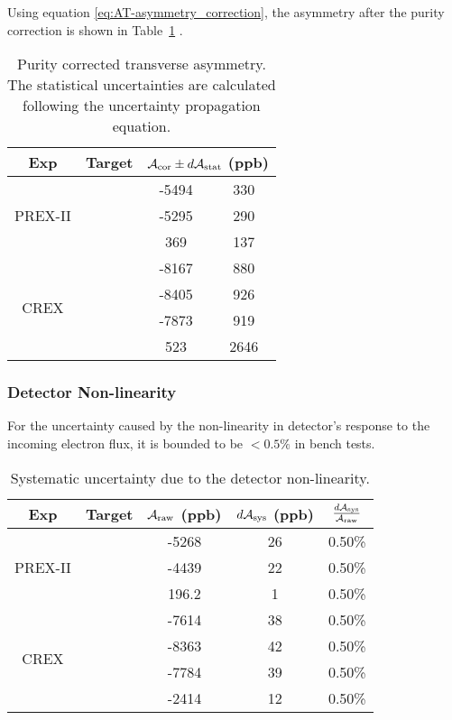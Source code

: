Using equation \ref{eq:AT-asymmetry_correction}, the asymmetry after the purity correction
is shown in Table~\ref{tab:purity_corrected_asymmetry} .
\begin{table}
    \centering
    \begin{tabular}{c c | c c }
	\hline
	Exp & Target	
	& \multicolumn{2}{c}{$\mathcal{A}_{\text{cor}}  \pm d\mathcal{A}_{\text{stat}}$ (ppb)}	    \\
	\hline
	\multirow{3}{*}{PREX-II}
	    & \Carbon    & -5494	& 330	 \\ 
	    & \Ca   & -5295	& 290	 \\ 
	    & \Pb   & 369	& 137	 \\ 
	\hline
	\multirow{4}{*}{CREX}
	    & \Carbon    & -8167	& 880	 \\ 
	    & \ca   & -8405	& 926	 \\ 
	    & \Ca   & -7873	& 919	 \\ 
	    & \Pb   & 523	& 2646	 \\ 
	\hline
    \end{tabular}
    \caption{Purity corrected transverse asymmetry. The statistical uncertainties
    are calculated following the uncertainty propagation equation.}
    \label{tab:purity_corrected_asymmetry}
\end{table}

\subsubsection{Detector Non-linearity}
For the uncertainty caused by the non-linearity in detector's response to the incoming electron flux,
it is bounded to be $<0.5\%$ in bench tests.
\begin{table}[!h]
    \centering
    \begin{tabular}{c c | c c c}
	\hline
	Exp & Target	& $\mathcal{A}_{\text{raw}}$ (ppb) & $d\mathcal{A}_{\text{sys}}$ (ppb)    & $\frac{d\mathcal{A}_{\text{sys}}}{\mathcal{A}_{\text{raw}}}$   \\
	\hline
	\multirow{3}{*}{PREX-II}
	    & \Carbon    & -5268	& 26	& 0.50\%    \\ 
	    & \ca   & -4439	& 22	& 0.50\%    \\ 
	    & \Pb   & 196.2	& 1	& 0.50\%    \\ 
	\hline
	\multirow{4}{*}{CREX}
	    & \Carbon    & -7614	& 38	& 0.50\%    \\ 
	    & \ca   & -8363	& 42	& 0.50\%    \\ 
	    & \Ca   & -7784	& 39	& 0.50\%    \\ 
	    & \Pb   & -2414	& 12	& 0.50\%    \\ 
	\hline
    \end{tabular}
    \caption{Systematic uncertainty due to the detector non-linearity.}
\end{table}

